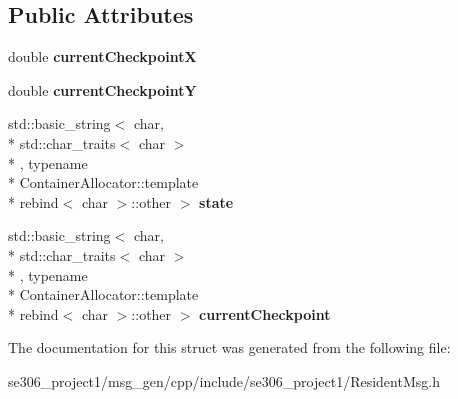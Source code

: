 \subsection*{Public Attributes}
\begin{DoxyCompactItemize}
\item 
\hypertarget{structse306__project1_1_1ResidentMsg___aad2a35f578c3ed9a1bc6b537163378ae}{double {\bfseries current\-Checkpoint\-X}}\label{structse306__project1_1_1ResidentMsg___aad2a35f578c3ed9a1bc6b537163378ae}

\item 
\hypertarget{structse306__project1_1_1ResidentMsg___afb1841a045e6bc072dc683414c3fdd1d}{double {\bfseries current\-Checkpoint\-Y}}\label{structse306__project1_1_1ResidentMsg___afb1841a045e6bc072dc683414c3fdd1d}

\item 
\hypertarget{structse306__project1_1_1ResidentMsg___a4035eb47fd7b516964e40cffb1dfe575}{std\-::basic\-\_\-string$<$ char, \\*
std\-::char\-\_\-traits$<$ char $>$\\*
, typename \\*
Container\-Allocator\-::template \\*
rebind$<$ char $>$\-::other $>$ {\bfseries state}}\label{structse306__project1_1_1ResidentMsg___a4035eb47fd7b516964e40cffb1dfe575}

\item 
\hypertarget{structse306__project1_1_1ResidentMsg___a82f6ec02330664d82be5bed971f6471e}{std\-::basic\-\_\-string$<$ char, \\*
std\-::char\-\_\-traits$<$ char $>$\\*
, typename \\*
Container\-Allocator\-::template \\*
rebind$<$ char $>$\-::other $>$ {\bfseries current\-Checkpoint}}\label{structse306__project1_1_1ResidentMsg___a82f6ec02330664d82be5bed971f6471e}

\end{DoxyCompactItemize}


The documentation for this struct was generated from the following file\-:\begin{DoxyCompactItemize}
\item 
se306\-\_\-project1/msg\-\_\-gen/cpp/include/se306\-\_\-project1/Resident\-Msg.\-h\end{DoxyCompactItemize}

